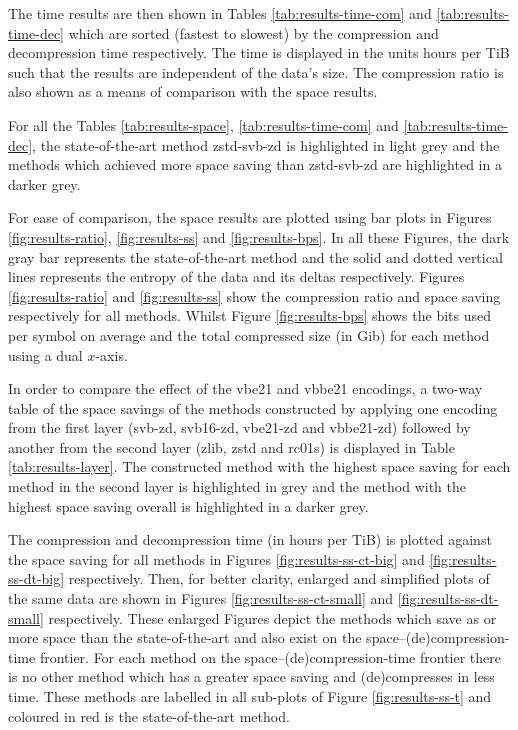 The time results are then shown in Tables \ref{tab:results-time-com} and
\ref{tab:results-time-dec} which are sorted (fastest to slowest) by the
compression and decompression time respectively. The time is displayed in
the units hours per TiB such that the results are independent of the data's
size. The compression ratio is also shown as a means of comparison with the
space results.

For all the Tables \ref{tab:results-space}, \ref{tab:results-time-com} and \ref{tab:results-time-dec},
the state-of-the-art method zstd-svb-zd is highlighted in light grey and the
methods which achieved more space saving than zstd-svb-zd are highlighted in a
darker grey.

For ease of comparison, the space results are plotted using bar plots in Figures
\ref{fig:results-ratio}, \ref{fig:results-ss} and
\ref{fig:results-bps}. In all these Figures, the dark gray bar represents
the state-of-the-art method and the solid and dotted vertical lines represents
the entropy of the data and its deltas respectively. Figures \ref{fig:results-ratio} and
\ref{fig:results-ss} show the compression ratio and space saving respectively for all
methods. Whilst Figure \ref{fig:results-bps} shows the bits used per symbol on
average and the total compressed size (in Gib) for each method using a dual
$x$-axis.

In order to compare the effect of the vbe21 and vbbe21 encodings, a two-way
table of the space savings of the methods constructed by applying one encoding from the
first layer (svb-zd, svb16-zd, vbe21-zd and vbbe21-zd) followed by another from
the second layer (zlib, zstd and rc01s) is displayed in Table
\ref{tab:results-layer}. The constructed method with the highest space saving for
each method in the second layer is highlighted in grey and the method with the
highest space saving overall is highlighted in a darker grey.

The compression and decompression time (in hours per TiB) is plotted against the
space saving for all methods in Figures \ref{fig:results-ss-ct-big} and
\ref{fig:results-ss-dt-big} respectively. Then, for better clarity, enlarged and
simplified plots of the same data are shown in Figures \ref{fig:results-ss-ct-small}
and \ref{fig:results-ss-dt-small} respectively. These enlarged Figures depict the
methods which save as or more space than the state-of-the-art and also exist on
the space--(de)compression-time frontier. For each method on the
space--(de)compression-time frontier there is no other method which has a
greater space saving and (de)compresses in less time. These methods are labelled
in all sub-plots of Figure \ref{fig:results-ss-t} and coloured in red is the
state-of-the-art method.

